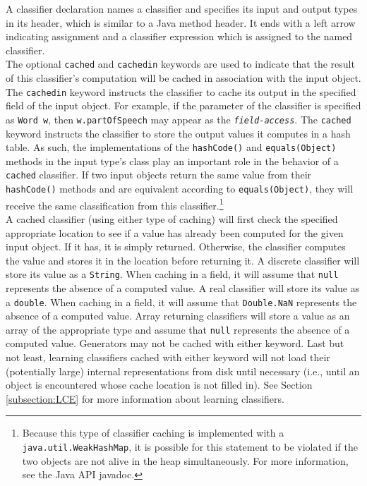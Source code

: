 \noindent
A classifier declaration names a classifier and specifies its input and output
types in its header, which is similar to a Java method header.
It ends with a left arrow indicating assignment and a classifier expression
which is assigned to the named classifier. \\

The optional {\tt cached} and {\tt cachedin} keywords are used to indicate
that the result of this classifier's computation will be cached in association
with the input object.  The {\tt cachedin} keyword instructs the classifier to
cache its output in the specified field of the input object.  For example, if
the parameter of the classifier is specified as {\tt Word w}, then
{\tt w.partOfSpeech} may appear as the {\tt\emph{field-access}}.  The
{\tt cached} keyword instructs the classifier to store the output values it
computes in a hash table.  As such, the implementations of the
{\tt hashCode()} and {\tt equals(Object)} methods in the input type's class
play an important role in the behavior of a {\tt cached} classifier.  If two
input objects return the same value from their {\tt hashCode()} methods and
are equivalent according to {\tt equals(Object)}, they will receive the same
classification from this classifier.\footnote{Because this type of classifier
caching is implemented with a {\tt java.util.WeakHashMap}, it is possible for
this statement to be violated if the two objects are not alive in the heap
simultaneously.  For more information, see the Java API javadoc.} \\

A cached classifier (using either type of caching) will first check the
specified appropriate location to see if a value has already been computed for
the given input object.  If it has, it is simply returned.  Otherwise, the
classifier computes the value and stores it in the location before returning
it.  A discrete classifier will store its value as a {\tt String}.  When
caching in a field, it will assume that {\tt null} represents the absence of a
computed value.  A real classifier will store its value as a {\tt double}.
When caching in a field, it will assume that {\tt Double.NaN} represents the
absence of a computed value.  Array returning classifiers will store a value
as an array of the appropriate type and assume that {\tt null} represents the
absence of a computed value.  Generators may not be cached with either
keyword.  Last but not least, learning classifiers cached with either keyword
will not load their (potentially large) internal representations from disk
until necessary (i.e., until an object is encountered whose cache location is
not filled in).  See Section \ref{subsection:LCE} for more information about
learning classifiers. \\

